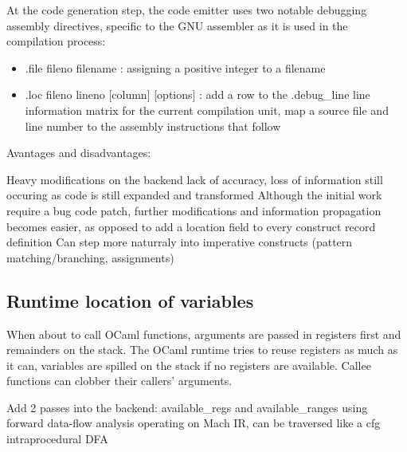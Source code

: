 At the code generation step, the code emitter uses two notable debugging
assembly directives, specific to the GNU assembler as it is used in the
compilation process:


\begin{itemize}
    \item .file fileno filename : assigning a positive integer to a filename
    \item .loc fileno lineno [column] [options] : add a row to the .debug\_line
        line information matrix for the current compilation unit, map a source
        file and line number to the assembly instructions that follow
\end{itemize}

Avantages and disadvantages:

\begin{itemize}
\fail
Heavy modifications on the backend
\fail lack of accuracy, loss of information still occuring as code is still expanded and transformed
\tick Although the initial work require a bug code patch, further modifications
and information propagation becomes easier, as opposed to add a location field
to every construct record definition
\tick Can step more naturraly into imperative constructs
(pattern matching/branching, assignments)
\end{itemize}

\subsection{Runtime location of variables}
When about to call OCaml functions, arguments are passed in registers first
and remainders on the stack.
The OCaml runtime tries to reuse registers as much as it can, variables
are spilled on the stack if no registers are available.
Callee functions can clobber their callers' arguments.

Add 2 passes into the backend: available\_regs and available\_ranges
using forward data-flow analysis operating on Mach IR, can be traversed like
a \gls{cfg}
intraprocedural DFA

